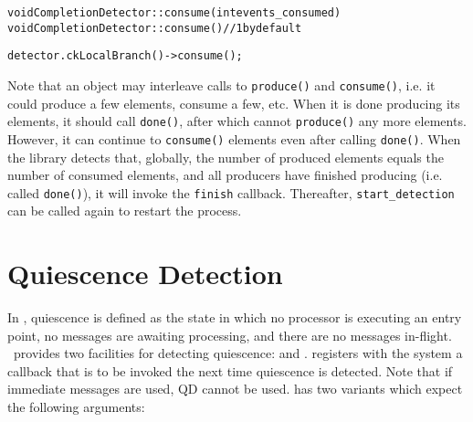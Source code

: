 \begin{alltt}
void CompletionDetector::consume(int events_consumed)
void CompletionDetector::consume() // 1 by default
\end{alltt}

\begin{alltt}
detector.ckLocalBranch()->consume();
\end{alltt}

Note that an object may interleave calls to {\tt produce()} and {\tt consume()}, i.e.
it could produce a few elements, consume a few, etc. When it is done producing its elements,
it should call {\tt done()}, after which cannot {\tt produce()} any more elements. However,
it can continue to {\tt consume()} elements even after calling {\tt done()}. 
When the library detects that, globally, the number of produced elements equals
the number of consumed elements, and all producers have finished producing
(i.e. called {\tt done()}), it will invoke the \verb|finish| callback.
Thereafter, \verb|start_detection| can be called again to restart the process.

\section{Quiescence Detection}
\label{sec:qd}

In \charmpp, quiescence is defined as the state in which no
processor is executing an entry point, no messages are awaiting processing, and
there are no messages in-flight.  \charmpp\ provides two facilities for
detecting quiescence:  and .  
registers with the system a callback that is to be invoked the next time
quiescence is detected. Note that if immediate messages are
used, QD cannot be used.   has two variants
which expect the following arguments: 

